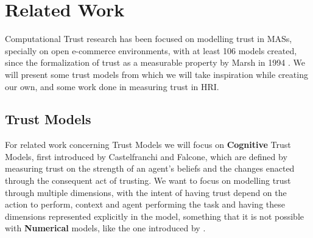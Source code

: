 

\section{Related Work}
\label{sec:Related Work}
Computational Trust research has been focused on modelling trust in \acp{MAS}, specially on open e-commerce environments\cite{Granatyr2015, HanYu2013, Pinyol2013, Noorian2010, Huang2008}, with at least 106 models created\cite{Granatyr2015}, since the formalization of trust as a measurable property by Marsh in 1994 \cite{Marsh1994}. We will present some trust models from which we will take inspiration while creating our own, and some work done in measuring trust in \ac{HRI}.

\subsection{Trust Models}
\label{subsec:Related work:Trust Models}
For related work concerning Trust Models we will focus on \textbf{Cognitive} Trust Models, first introduced by Castelfranchi and Falcone\cite{Castelfranchi1998}, which are defined by measuring trust on the strength of an agent's beliefs and the changes enacted through the consequent act of trusting. We want to focus on modelling trust through multiple dimensions, with the intent of having trust depend on the action to perform, context and agent performing the task and having these dimensions represented explicitly in the model, something that it is not possible with \textbf{Numerical} models, like the one introduced by \cite{Marsh1994}. 


